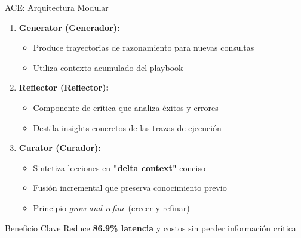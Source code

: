 \documentclass[aspectratio=169,11pt]{beamer}
\begin{document}
\begin{frame}{ACE: Arquitectura Modular}
\begin{enumerate}
    \item \textbf{Generator (Generador):}
    \begin{itemize}
        \item Produce trayectorias de razonamiento para nuevas consultas
        \item Utiliza contexto acumulado del playbook
    \end{itemize}
    
    \vspace{0.3cm}
    
    \item \textbf{Reflector (Reflector):}
    \begin{itemize}
        \item Componente de crítica que analiza éxitos y errores
        \item Destila insights concretos de las trazas de ejecución
    \end{itemize}
    
    \vspace{0.3cm}
    
    \item \textbf{Curator (Curador):}
    \begin{itemize}
        \item Sintetiza lecciones en \textbf{"delta context"} conciso
        \item Fusión incremental que preserva conocimiento previo
        \item Principio \textit{grow-and-refine} (crecer y refinar)
    \end{itemize}
\end{enumerate}

\vspace{0.3cm}

\begin{alertblock}{Beneficio Clave}
Reduce \textbf{86.9\% latencia} y costos sin perder información crítica
\end{alertblock}
\end{frame}
\end{document}

